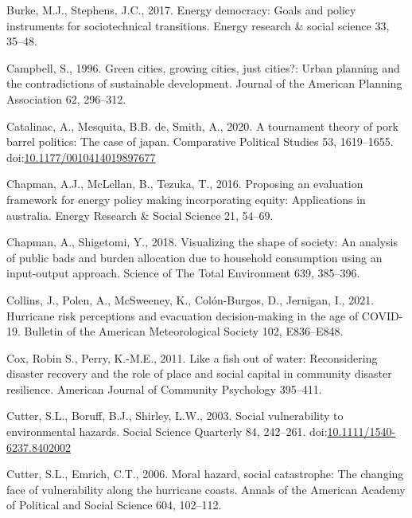\documentclass[]{elsarticle} %
\newlength{\cslhangindent}
\newlength{\cslentryspacingunit} %
\newenvironment{CSLReferences}[2] %
 {%
  \setlength{\parindent}{0pt}
  \ifodd #1
  \let\oldpar\par
  \def\par{\hangindent=\cslhangindent\oldpar}
  \fi
  \setlength{\parskip}{#2\cslentryspacingunit}
 }%
 {}
\begin{document}
\begin{CSLReferences}{1}{0}
\leavevmode{}%
Burke, M.J., Stephens, J.C., 2017. Energy democracy: Goals and policy
instruments for sociotechnical transitions. Energy research \& social
science 33, 35--48.

\leavevmode{}%
Campbell, S., 1996. Green cities, growing cities, just cities?: Urban
planning and the contradictions of sustainable development. Journal of
the American Planning Association 62, 296--312.

\leavevmode{}%
Catalinac, A., Mesquita, B.B. de, Smith, A., 2020. A tournament theory
of pork barrel politics: The case of japan. Comparative Political
Studies 53, 1619--1655.
doi:\href{https://doi.org/10.1177/0010414019897677}{10.1177/0010414019897677}

\leavevmode{}%
Chapman, A.J., McLellan, B., Tezuka, T., 2016. Proposing an evaluation
framework for energy policy making incorporating equity: Applications in
australia. Energy Research \& Social Science 21, 54--69.

\leavevmode{}%
Chapman, A., Shigetomi, Y., 2018. Visualizing the shape of society: An
analysis of public bads and burden allocation due to household
consumption using an input-output approach. Science of The Total
Environment 639, 385--396.

\leavevmode{}%
Collins, J., Polen, A., McSweeney, K., Colón-Burgos, D., Jernigan, I.,
2021. Hurricane risk perceptions and evacuation decision-making in the
age of COVID-19. Bulletin of the American Meteorological Society 102,
E836--E848.

\leavevmode{}%
Cox, Robin S., Perry, K.-M.E., 2011. Like a fish out of water:
Reconsidering disaster recovery and the role of place and social capital
in community disaster resilience. American Journal of Community
Psychology 395--411.

\leavevmode{}%
Cutter, S.L., Boruff, B.J., Shirley, L.W., 2003. Social vulnerability to
environmental hazards. Social Science Quarterly 84, 242--261.
doi:\href{https://doi.org/10.1111/1540-6237.8402002}{10.1111/1540-6237.8402002}

\leavevmode{}%
Cutter, S.L., Emrich, C.T., 2006. Moral hazard, social catastrophe: The
changing face of vulnerability along the hurricane coasts. Annals of the
American Academy of Political and Social Science 604, 102--112.


\end{CSLReferences}
\end{document}
